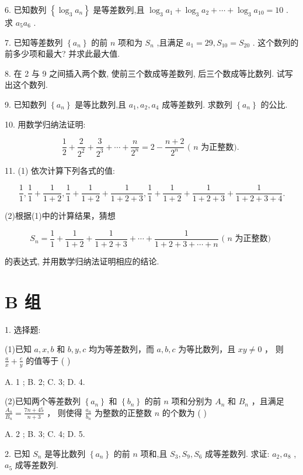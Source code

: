 \documentclass[10pt]{article}
\begin{document}
6. 已知数列 \(\left\{  {{\log }_{3}{a}_{n}}\right\}\) 是等差数列,且 \({\log }_{3}{a}_{1} + {\log }_{3}{a}_{2} + \cdots  + {\log }_{3}{a}_{10} = {10}\) . 求 \({a}_{5}{a}_{6}\) .

7. 已知等差数列 \(\left\{  {a}_{n}\right\}\) 的前 \(n\) 项和为 \({S}_{n}\) ,且满足 \({a}_{1} = {29},{S}_{10} = {S}_{20}\) . 这个数列的前多少项和最大? 并求此最大值.

8. 在 2 与 9 之间插入两个数, 使前三个数成等差数列, 后三个数成等比数列. 试写出这个数列.

9. 已知数列 \(\left\{  {a}_{n}\right\}\) 是等比数列,且 \({a}_{1},{a}_{2},{a}_{4}\) 成等差数列. 求数列 \(\left\{  {a}_{n}\right\}\) 的公比.

10. 用数学归纳法证明:

\[
\frac{1}{2} + \frac{2}{{2}^{2}} + \frac{3}{{2}^{3}} + \cdots  + \frac{n}{{2}^{n}} = 2 - \frac{n + 2}{{2}^{n}}\text{ ( }n\text{ 为正整数). }
\]

11. (1) 依次计算下列各式的值:

\[
\frac{1}{1},\frac{1}{1} + \frac{1}{1 + 2},\frac{1}{1} + \frac{1}{1 + 2} + \frac{1}{1 + 2 + 3},\frac{1}{1} + \frac{1}{1 + 2} + \frac{1}{1 + 2 + 3} + \frac{1}{1 + 2 + 3 + 4}.
\]

(2)根据(1)中的计算结果，猜想

\[
{S}_{n} = \frac{1}{1} + \frac{1}{1 + 2} + \frac{1}{1 + 2 + 3} + \cdots  + \frac{1}{1 + 2 + 3 + \cdots  + n}\text{ ( }n\text{ 为正整数) }
\]

的表达式, 并用数学归纳法证明相应的结论.

\section*{B 组}

1. 选择题:

(1)已知 \(a,x,b\) 和 \(b,y,c\) 均为等差数列，而 \(a,b,c\) 为等比数列，且 \({xy} \neq  0\) ， 则 \(\frac{a}{x} + \frac{c}{y}\) 的值等于 ( )

A. 1 ; B. 2; C. 3; D. 4.

(2)已知两个等差数列 \(\left\{  {a}_{n}\right\}\) 和 \(\left\{  {b}_{n}\right\}\) 的前 \(n\) 项和分别为 \({A}_{n}\) 和 \({B}_{n}\) ，且满足 \(\frac{{A}_{n}}{{B}_{n}} = \frac{{7n} + {45}}{n + 3}\) ， 则使得 \(\frac{{a}_{n}}{{b}_{n}}\) 为整数的正整数 \(n\) 的个数为 ( )

A. 2 ; B. 3; C. 4; D. 5.

2. 已知 \({S}_{n}\) 是等比数列 \(\left\{  {a}_{n}\right\}\) 的前 \(n\) 项和,且 \({S}_{3},{S}_{9},{S}_{6}\) 成等差数列. 求证: \({a}_{2},{a}_{8}\) , \({a}_{5}\) 成等差数列.
\end{document}

